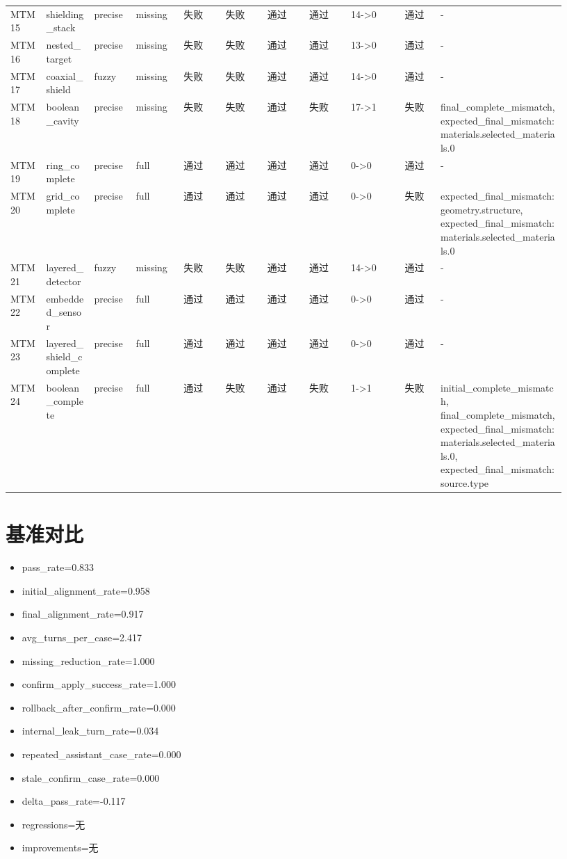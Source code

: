 \documentclass[11pt]{ctexart}
\begin{document}
\begin{longtable}{p{0.06\linewidth}p{0.08\linewidth}p{0.07\linewidth}p{0.08\linewidth}p{0.07\linewidth}p{0.07\linewidth}p{0.07\linewidth}p{0.07\linewidth}p{0.09\linewidth}p{0.06\linewidth}p{0.21\linewidth}}
MTM15 & shielding\_stack & precise & missing & 失败 & 失败 & 通过 & 通过 & 14->0 & 通过 & - \\
MTM16 & nested\_target & precise & missing & 失败 & 失败 & 通过 & 通过 & 13->0 & 通过 & - \\
MTM17 & coaxial\_shield & fuzzy & missing & 失败 & 失败 & 通过 & 通过 & 14->0 & 通过 & - \\
MTM18 & boolean\_cavity & precise & missing & 失败 & 失败 & 通过 & 失败 & 17->1 & 失败 & final\_complete\_mismatch, expected\_final\_mismatch:materials.selected\_materials.0 \\
MTM19 & ring\_complete & precise & full & 通过 & 通过 & 通过 & 通过 & 0->0 & 通过 & - \\
MTM20 & grid\_complete & precise & full & 通过 & 通过 & 通过 & 通过 & 0->0 & 失败 & expected\_final\_mismatch:geometry.structure, expected\_final\_mismatch:materials.selected\_materials.0 \\
MTM21 & layered\_detector & fuzzy & missing & 失败 & 失败 & 通过 & 通过 & 14->0 & 通过 & - \\
MTM22 & embedded\_sensor & precise & full & 通过 & 通过 & 通过 & 通过 & 0->0 & 通过 & - \\
MTM23 & layered\_shield\_complete & precise & full & 通过 & 通过 & 通过 & 通过 & 0->0 & 通过 & - \\
MTM24 & boolean\_complete & precise & full & 通过 & 失败 & 通过 & 失败 & 1->1 & 失败 & initial\_complete\_mismatch, final\_complete\_mismatch, expected\_final\_mismatch:materials.selected\_materials.0, expected\_final\_mismatch:source.type \\
\bottomrule
\end{longtable}
\section{基准对比}
\begin{itemize}
\item pass\_rate=0.833
\item initial\_alignment\_rate=0.958
\item final\_alignment\_rate=0.917
\item avg\_turns\_per\_case=2.417
\item missing\_reduction\_rate=1.000
\item confirm\_apply\_success\_rate=1.000
\item rollback\_after\_confirm\_rate=0.000
\item internal\_leak\_turn\_rate=0.034
\item repeated\_assistant\_case\_rate=0.000
\item stale\_confirm\_case\_rate=0.000
\item delta\_pass\_rate=-0.117
\item regressions=无
\item improvements=无
\end{itemize}
\appendix
\end{document}
